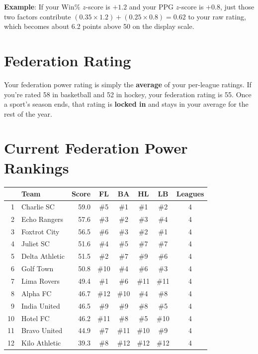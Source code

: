 \documentclass[11pt,letterpaper]{article}
\newcommand{\rowalt}{\rowcolor{fedlight}}
\begin{document}
\textbf{Example}: If your Win\% $z$-score is $+1.2$ and your PPG $z$-score is $+0.8$, just those two factors contribute $(0.35 \times 1.2) + (0.25 \times 0.8) = 0.62$ to your raw rating, which becomes about 6.2 points above 50 on the display scale.

\section{Federation Rating}

Your federation power rating is simply the \textbf{average} of your per-league ratings. If you're rated 58 in basketball and 52 in hockey, your federation rating is 55. Once a sport's season ends, that rating is \textbf{locked in} and stays in your average for the rest of the year.

\section{Current Federation Power Rankings}

\begin{table}[H]
\centering
\small
\begin{tabular}{@{}rlrccccc@{}}
\toprule
& \textbf{Team} & \textbf{Score} & \textbf{FL} & \textbf{BA} & \textbf{HL} & \textbf{LB} & \textbf{Leagues} \\
\midrule
\rowalt 1 & Charlie SC & 59.0 & \#5 & \#1 & \#1 & \#2 & 4 \\
2 & Echo Rangers & 57.6 & \#3 & \#2 & \#3 & \#4 & 4 \\
\rowalt 3 & Foxtrot City & 56.5 & \#6 & \#3 & \#2 & \#1 & 4 \\
4 & Juliet SC & 51.6 & \#4 & \#5 & \#7 & \#7 & 4 \\
\rowalt 5 & Delta Athletic & 51.5 & \#2 & \#7 & \#9 & \#6 & 4 \\
6 & Golf Town & 50.8 & \#10 & \#4 & \#6 & \#3 & 4 \\
\rowalt 7 & Lima Rovers & 49.4 & \#1 & \#6 & \#11 & \#11 & 4 \\
8 & Alpha FC & 46.7 & \#12 & \#10 & \#4 & \#8 & 4 \\
\rowalt 9 & India United & 46.5 & \#9 & \#9 & \#8 & \#5 & 4 \\
10 & Hotel FC & 46.2 & \#11 & \#8 & \#5 & \#10 & 4 \\
\rowalt 11 & Bravo United & 44.9 & \#7 & \#11 & \#10 & \#9 & 4 \\
12 & Kilo Athletic & 39.3 & \#8 & \#12 & \#12 & \#12 & 4 \\
\bottomrule
\end{tabular}
\end{table}
\end{document}
